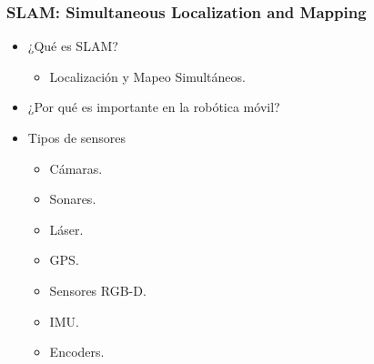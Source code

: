 \documentclass[compress]{beamer}
\begin{document}
\begin{frame}
	\frametitle{SLAM: Simultaneous Localization and Mapping}
    \begin{itemize}
        \item ¿Qué es SLAM?
        \begin{itemize}
            \item Localización y Mapeo Simultáneos.
        \end{itemize}
        \item ¿Por qué es importante en la robótica móvil? 
    \end{itemize}

    \begin{itemize}
            \item Tipos de sensores
            \begin{itemize}
                \item Cámaras.
				\item Sonares.
				\item Láser.
				\item GPS.
				\item Sensores RGB-D.
				\item IMU.
				\item Encoders.
            \end{itemize}
    \end{itemize}

\end{frame}
\end{document}
